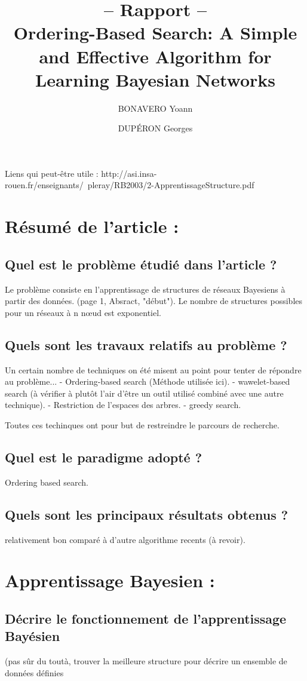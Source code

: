 \documentclass[french,a4paper]{article}
\title{-- Rapport -- \\ Ordering-Based Search: A Simple and Effective Algorithm for Learning Bayesian Networks}
\author{BONAVERO Yoann \and DUPÉRON Georges}
\begin{document}
\maketitle
\newpage

Liens qui peut-être utile : 
http://asi.insa-rouen.fr/enseignants/~pleray/RB2003/2-ApprentissageStructure.pdf

\section{Résumé de l’article :}
\subsection{Quel est le problème étudié dans l’article ?}
Le problème consiste en l'apprentissage de structures de réseaux Bayesiens à partir des données.
(page 1, Absract, "début").
Le nombre de structures possibles pour un réseaux à n nœud est exponentiel.
\subsection{Quels sont les travaux relatifs au problème ? }
Un certain nombre de techniques on été misent au point pour tenter de répondre au problème...
- Ordering-based search (Méthode utilisée ici).
- wawelet-based search (à vérifier à plutôt l'air d'être un outil utilisé combiné avec une autre technique).
- Restriction de l'espaces des arbres.
- greedy search.

Toutes ces techinques ont pour but de restreindre le parcours de recherche.

\subsection{Quel est le paradigme adopté ?}
Ordering based search.
\subsection{Quels sont les principaux résultats obtenus ?}
relativement bon comparé à d'autre algorithme recents (à revoir).

\section{Apprentissage Bayesien :}
\subsection{Décrire le fonctionnement de l'apprentissage Bayésien}
(pas sûr du toutà, trouver la meilleure structure pour décrire un ensemble de données définies
\end{document}
